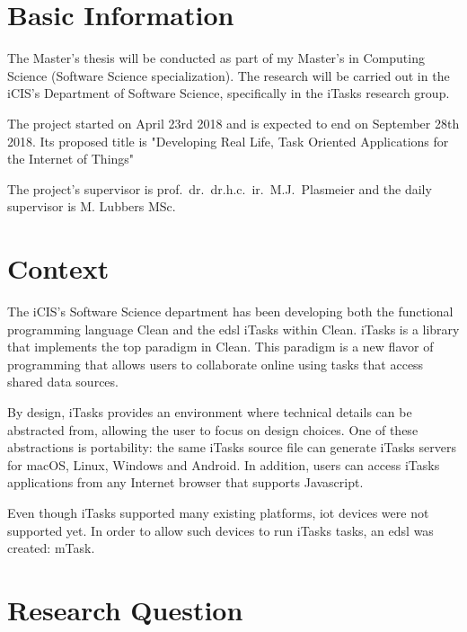\documentclass{article}
\date{June 12th, 2018}
\author{Matheus Amazonas Cabral de Andrade}
\newcommand{\projecttitle}{Developing Real Life, Task Oriented Applications for the Internet of Things}
\newcommand{\rinus}{prof.~dr.~dr.h.c.~ir.~M.J.~Plasmeier }
\newcommand{\mart}{M. Lubbers MSc.}
\begin{document}
\maketitleru[
    layout=seventeen,
    title=Master's Thesis Proposal,
    course=Computing Science,
    subtitle=\projecttitle,
    others={{Supervisor:}{\rinus},{Daily Supervisor:}{\mart}}]
\clearpage

\section{Basic Information}

The Master's thesis will be conducted as part of my Master's in Computing Science (Software Science specialization). The research will be carried out in the iCIS's Department of Software Science, specifically in the iTasks research group.

The project started on April 23rd 2018 and is expected to end on September 28th 2018. Its proposed title is "\projecttitle"

The project's supervisor is \rinus and the daily supervisor is \mart

\section{Context}
The iCIS's Software Science department has been developing both the functional programming language Clean and the \acrfull{edsl} iTasks within Clean. iTasks is a library that implements the \acrfull{top} paradigm in Clean. This paradigm is a new flavor of programming that allows users to collaborate online using tasks that access shared data sources.

By design, iTasks provides an environment where technical details can be abstracted from, allowing the user to focus on design choices. One of these abstractions is portability: the same iTasks source file can generate iTasks servers for macOS, Linux, Windows and Android. In addition, users can access iTasks applications from any Internet browser that supports Javascript. 

Even though iTasks supported many existing platforms, \acrfull{iot} devices were not supported yet. In order to allow such devices to run iTasks tasks, an \acrshort{edsl} was created: mTask.  

\section{Research Question}
\end{document}
